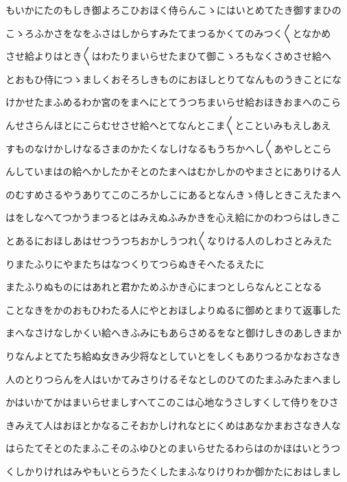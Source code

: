 \documentclass[a4paper,11pt,landscape]{ltjtarticle}
\begin{document}
\par\medskip
もいかにたのもしき御よろこひおほく侍らんこゝにはいとめてたき御すまひの
\par\medskip
こゝろふかさをなをふさはしからすみたてまつるかくてのみつく〱となかめ
\par\medskip
させ給よりはとき〱はわたりまいらせたまひて御こゝろもなくさめさせ給へ
\par\medskip
とおもひ侍につゝましくおそろしきものにおほしとりてなんものうきことにな
\par\medskip
けかせたまふめるわか宮のをまへにとてうつちまいらせ給おほきおまへのこら
\par\medskip
んせさらんほとにこらむせさせ給へとてなんとこま〱とこといみもえしあえ
\par\medskip
すものなけかしけなるさまのかたくなしけなるもうちかへし〱あやしとこら
\par\medskip
んしていまはの給へかしたかそとのたまへはむかしかのやまさとにありける人
\par\medskip
のむすめさるやうありてこのころかしこにあるとなんきゝ侍しときこえたまへ
\par\medskip
はをしなへてつかうまつるとはみえぬふみかきを心え給にかのわつらはしきこ
\par\medskip
とあるにおほしあはせつうつちおかしうつれ〱なりける人のしわさとみえた
\par\medskip
りまたふりにやまたちはなつくりてつらぬきそへたるえたに
\par\medskip
またふりぬものにはあれと君かためふかき心にまつとしらなんとことなる
\par\medskip
ことなきをかのおもひわたる人にやとおほしよりぬるに御めとまりて返事した
\par\medskip
まへなさけなしかくい給へきふみにもあらさめるをなと御けしきのあしきまか
\par\medskip
りなんよとてたち給ぬ女きみ少将なとしていとをしくもありつるかなおさなき
\par\medskip
人のとりつらんを人はいかてみさりけるそなとしのひてのたまふみたまへまし
\par\medskip
かはいかてかはまいらせましすへてこのこは心地なうさしすくして侍りをひさ
\par\medskip
きみえて人はおほとかなるこそおかしけれなとにくめはあなかまおさなき人な
\par\medskip
はらたてそとのたまふこそのふゆひとのまいらせたるわらはのかほはいとうつ
\par\medskip
くしかりけれはみやもいとらうたくしたまふなりけりわか御かたにおはしまし
\par\medskip
\end{document}
